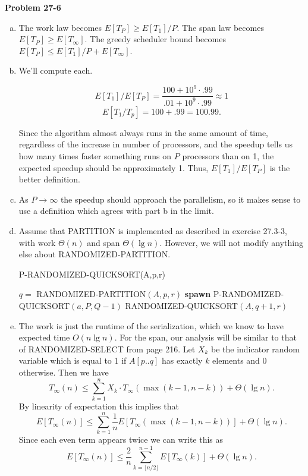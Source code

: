 \documentclass{article}
\begin{document}
\noindent\textbf{Problem 27-6}\\

\begin{enumerate}[a.]
\item The work law becomes $E[T_P] \geq E[T_1]/P$.  The span law becomes $E[T_P] \geq E[T_\infty]$. The greedy scheduler bound becomes $E[T_P] \leq E[T_1]/P + E[T_\infty]$. 

\item We'll compute each.  

\[ E[T_1] / E[T_P] = \frac{100 + 10^9\cdot.99}{.01 + 10^9\cdot .99} \approx 1\]
\[ E[T_1/T_p] = 100 + .99 = 100.99.\]

Since the algorithm almost always runs in the same amount of time, regardless of the increase in number of processors, and the speedup tells us how many times faster something runs on $P$ processors than on 1, the expected speedup should be approximately 1.  Thus, $E[T_1]/E[T_P]$ is the better definition. 

\item As $P \to \infty$ the speedup should approach the parallelism, so it makes sense to use a definition which agrees with part b in the limit. 

\item Assume that PARTITION is implemented as described in exercise 27.3-3, with work $\Theta(n)$ and span $\Theta(\lg n)$. However, we will not modify anything else about RANDOMIZED-PARTITION. 

\begin{algorithm}
\caption{P-RANDOMIZED-QUICKSORT(A,p,r)}
\begin{algorithmic}[1]
	\State $q = $ RANDOMIZED-PARTITION$(A,p,r)$
	\State \textbf{spawn} P-RANDOMIZED-QUICKSORT$(a,P,Q-1)$
	\State RANDOMIZED-QUICKSORT$(A,q+1,r)$
\EndIf
\end{algorithmic}
\end{algorithm}

\item The work is just the runtime of the serialization, which we know to have expected time $O(n \lg n)$.  For the span, our analysis will be similar to that of RANDOMIZED-SELECT from page 216.  Let $X_k$ be the indicator random variable which is equal to 1 if $A[p..q]$ has exactly $k$ elements and 0 otherwise. Then we have
\[ T_\infty(n) \leq \sum_{k=1}^n X_k \cdot T_\infty(\max(k-1, n-k)) + \Theta(\lg n).\]
By linearity of expectation this implies that
\[E[T_\infty(n)] \leq \sum_{k=1}^n \frac{1}{n}E[T_\infty(\max(k-1, n-k))] + \Theta(\lg n).\]
Since each even term appears twice we can write this as
\[ E[T_\infty(n)] \leq \frac{2}{n}\sum_{k=\lfloor n/2 \rfloor}^{n-1} E[T_\infty(k)] + \Theta(\lg n).\]



\end{enumerate}
\end{document}
